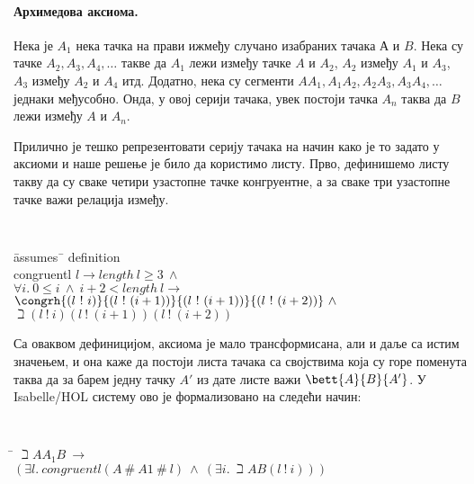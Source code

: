\paragraph{Архимедова аксиома.}
Нека је $A_1$ нека тачка на прави ижмеђу случано изабраних тачака $А$
и $B$. Нека су тачке $A_2, A_3, A_4, \ldots$ такве да $A_1$ лежи
између тачке $A$ и $A_2$, $A_2$ између $A_1$ и $A_3$, $A_3$ између
$A_2$ и $A_4$ итд. Додатно, нека су сегменти $AA_1, A_1A_2, A_2A_3,
A_3A_4, \ldots$ једнаки међусобно. Онда, у овој серији тачака, увек
постоји тачка $A_n$ таква да $B$ лежи између $A$ и $A_n$.

Прилично је тешко репрезентовати серију тачака на начин како је то
задато у аксиоми и наше решење је било да користимо листу. Прво,
дефинишемо листу такву да су сваке четири узастопне тачке конгруентне,
а за сваке три узастопне тачке важи релација између.

{\tt
\begin{tabbing}
\hspace{5mm}\=assumes\ \=\kill
definition \\
\> congruentl $l \longrightarrow length\ l \ge 3\ \wedge$\\
\>\>  $\forall i.\ 0 \le i\ \wedge\ i+2 < length\ l \longrightarrow$ \\
\>\>  $\congrh{(l\ !\ i)}{(l\ !\ (i+1))}{(l\ !\ (i+1))}{(l\ !\ (i+2))}\ \wedge $\\
\>\>  $\beth{(l\ !\ i)}{(l\ !\ (i+1))}{(l\ !\ (i+2))}$
\end{tabbing}
}

Са оваквом дефиницијом, аксиома је мало трансформисана, али и даље са
истим значењем, и она каже да постоји листа тачака са својствима која
су горе поменута таква да за барем једну тачку $A'$ из дате листе важи
$\bett{A}{B}{A'}$. У Isabelle/HOL систему ово је формализовано на
следећи начин:

{\tt
\begin{tabbing}
\hspace{5mm}\=\kill
$\beth{A}{A_1}{B}\ \longrightarrow$\\
\> $(\exists l.\ congruentl (A\ \#\ A1\ \#\ l)\ \wedge\ (\exists i.\ \beth{A}{B}{(l\ !\ i)}))$
\end{tabbing}
}


